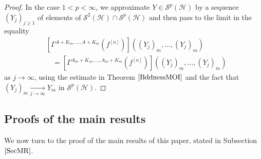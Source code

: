 \documentclass[12pt]{amsart}
\theoremstyle{remark}
\begin{document}
\begin{proof}
In the case $1 < p < \infty$, we approximate $Y \in \mathcal{S}^p(\mathcal{H})$ by a sequence $(Y_j)_{j\geq 1}$ of elements of $\mathcal{S}^2(\mathcal{H}) \cap \mathcal{S}^p(\mathcal{H})$ and then pass to the limit in the equality
\begin{align*}
&\left[\Gamma^{A+K_m, \ldots, A+K_m}(f^{[n]}) \right]((Y_j)_m, \ldots, (Y_j)_m) \\
& \ \ \ \ = \left[\Gamma^{A_m+K_m, \ldots, A_m+K_m}(f^{[n]}) \right]((Y_j)_m, \ldots, (Y_j)_m)
\end{align*}
as $j \to \infty$, using the estimate in Theorem $\ref{BddnessMOI}$ and the fact that $(Y_j)_m \underset{j \to \infty}{\longrightarrow} Y_m$ in $\mathcal{S}^p(\mathcal{H})$.
\end{proof}



\subsection{Proofs of the main results}\label{ProofofMR}


We now turn to the proof of the main results of this paper, stated in Subsection $\ref{SecMR}$.
\end{document}
